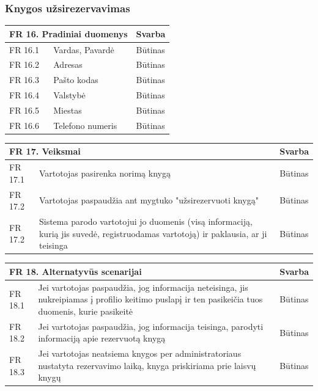 \documentclass{VUMIFPSkursinis}
\begin{document}
 \subsubsection{Knygos užsirezervavimas}
 \noindent
 \vspace{5mm}
 \begin{tabular}{ | p{} | p{} | p{} |}
    \hline
    \multicolumn{2}{|l|}{FR 16. Pradiniai duomenys} &Svarba  \\ \hline 
  FR 16.1& Vardas, Pavardė&  Būtinas\\ \hline
 FR 16.2 &Adresas&  Būtinas\\ \hline
 FR 16.3 &Pašto kodas&  Būtinas\\ \hline
 FR 16.4 &Valstybė&  Būtinas\\ \hline
 FR 16.5 &Miestas&  Būtinas\\ \hline
 FR 16.6 &Telefono numeris&  Būtinas\\ \hline
  \end{tabular}
    \vspace{5mm}   
 \begin{tabular}{ | p{} | p{} | p{} |}
    \hline
        \multicolumn{2}{|l|}{   FR 17. Veiksmai} &Svarba  \\ \hline 
 FR 17.1& Vartotojas pasirenka norimą knygą&  Būtinas\\ \hline
FR 17.2 &Vartotojas paspaudžia ant mygtuko "užsirezervuoti knygą"&  Būtinas\\ \hline
 FR 17.2& Sistema parodo vartotojui jo duomenis (visą informaciją, kurią jis suvedė,
 registruodamas vartotoją) ir paklausia, ar ji teisinga&  Būtinas\\ \hline
    \end{tabular}
    \vspace{5mm}  
 \begin{tabular}{ | p{} | p{} | p{} |}
    \hline
   \multicolumn{2}{|l|}{  FR 18. Alternatyvūs scenarijai} &Svarba  \\ \hline 
  FR 18.1& Jei vartotojas paspaudžia, jog informacija neteisinga, jis nukreipiamas į
profilio keitimo puslapį ir ten pasikeičia tuos duomenis, kurie pasikeitė&  Būtinas\\ \hline
FR 18.2 &Jei vartotojas paspaudžia, jog informacija teisinga, parodyti informaciją apie rezervuotą knygą&  Būtinas\\ \hline
FR 18.3 &Jei vartotojas neatsiema knygos per administratoriaus nustatyta rezervavimo laiką, knyga priskiriama prie laisvų knygų&  Būtinas\\ \hline
    \end{tabular}
\end{document}
